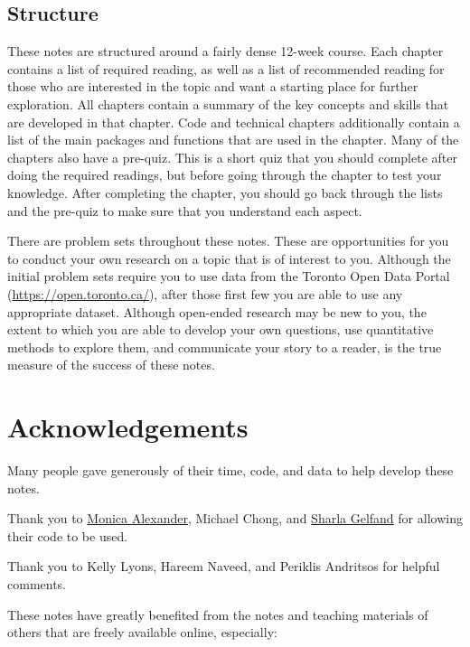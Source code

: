 \documentclass[
]{book}
\begin{document}
\hypertarget{structure-1}{%
\subsection{Structure}\label{structure-1}}

These notes are structured around a fairly dense 12-week course. Each chapter contains a list of required reading, as well as a list of recommended reading for those who are interested in the topic and want a starting place for further exploration. All chapters contain a summary of the key concepts and skills that are developed in that chapter. Code and technical chapters additionally contain a list of the main packages and functions that are used in the chapter. Many of the chapters also have a pre-quiz. This is a short quiz that you should complete after doing the required readings, but before going through the chapter to test your knowledge. After completing the chapter, you should go back through the lists and the pre-quiz to make sure that you understand each aspect.

There are problem sets throughout these notes. These are opportunities for you to conduct your own research on a topic that is of interest to you. Although the initial problem sets require you to use data from the Toronto Open Data Portal (\url{https://open.toronto.ca/}), after those first few you are able to use any appropriate dataset. Although open-ended research may be new to you, the extent to which you are able to develop your own questions, use quantitative methods to explore them, and communicate your story to a reader, is the true measure of the success of these notes.

\hypertarget{acknowledgements}{%
\section{Acknowledgements}\label{acknowledgements}}

Many people gave generously of their time, code, and data to help develop these notes.

Thank you to \href{https://www.monicaalexander.com/}{Monica Alexander}, Michael Chong, and \href{https://sharla.party/}{Sharla Gelfand} for allowing their code to be used.

Thank you to Kelly Lyons, Hareem Naveed, and Periklis Andritsos for helpful comments.

These notes have greatly benefited from the notes and teaching materials of others that are freely available online, especially:
\end{document}
